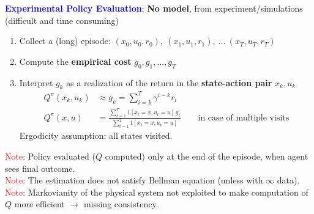 \begin{tcolorbox}[colframe=cyan!50!black, colback=cyan!5!white, title=Policy Iteration]
\textbf{\textcolor{blue}{Experimental Policy Evaluation}}: \textbf{No model}, from experiment/simulations (difficult and time consuming)
\begin{enumerate}
    \item Collect a (long) episode: \qquad $(x_0, u_0, r_0), \ (x_1, u_1, r_1), \ \ldots \ (x_T, u_T, r_T)$
    \item Compute the \textbf{empirical cost} \quad $g_0, g_1, \ldots, g_T$
    \item Interpret $g_k$ as a realization of the return in the \textbf{state-action pair} $x_k, u_k$
    \begin{align*}
        Q^{\pi}(x_k, u_k) &\approx g_k = \sum_{i=k}^{T} \gamma^{i-k} r_i \\
        Q^{\pi}(x, u) &= \frac{\sum_{t=1}^{T} 1[x_t = x, u_t = u] \, g_t}{\sum_{t=1}^{T} 1[x_t = x, u_t = u]} \qquad \text{in case of multiple visits}
    \end{align*}
    Ergodicity assumption: all states visited.
\end{enumerate}
\textcolor{red}{Note}: Policy evaluated ($Q$ computed) only at the end of the episode, when agent sees final outcome. \\
\textcolor{red}{Note}: The estimation does not satisfy Bellman equation (unless with $\infty$ data). \\
\textcolor{red}{Note}: Markovianity of the physical system not exploited to make computation of $Q$ more efficient $\rightarrow$ missing consistency.\\


\end{tcolorbox}
